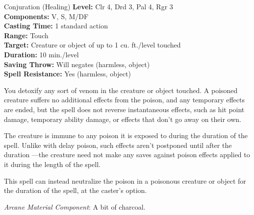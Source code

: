 {Conjuration (Healing)}
{
	\textbf{Level:}
	Clr 4, Drd 3, Pal 4, Rgr 3\\
	\textbf{Components:}
	V, S, M/DF\\
	\textbf{Casting Time:}
	1 standard action\\
	\textbf{Range:}
	Touch\\
	\textbf{Target:}
	Creature or object of up to 1 cu. ft./level touched\\
	\textbf{Duration:}
	10 min./level\\
	\textbf{Saving Throw:}
	Will negates (harmless, object)\\
	\textbf{Spell Resistance:}
	Yes (harmless, object)\\
}
{
	You detoxify any sort of venom in the creature or object touched. A poisoned creature suffers no additional effects from the poison, and any temporary effects are ended, but the spell does not reverse instantaneous effects, such as hit point damage, temporary ability damage, or effects that don't go away on their own.

	The creature is immune to any poison it is exposed to during the duration of the spell. Unlike with delay poison, such effects aren't postponed until after the duration ---the creature need not make any saves against poison effects applied to it during the length of the spell.

	This spell can instead neutralize the poison in a poisonous creature or object for the duration of the spell, at the caster's option.

	\textit{Arcane Material Component}:
	A bit of charcoal.

}
